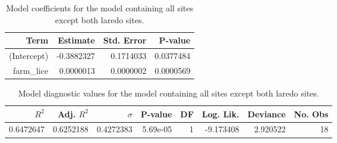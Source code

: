 \begin{table}
\centering
\caption{Model coefficients for the model containing all sites except
    both laredo sites.}
\centering
\begin{tabular}[t]{rrrr}
\toprule
Term & Estimate & Std. Error & P-value\\
\midrule
(Intercept) & -0.3882327 & 0.1714033 & 0.0377484\\
farm\_lice & 0.0000013 & 0.0000002 & 0.0000569\\
\bottomrule
\end{tabular}
\end{table}

\begin{table}
\centering
\caption{Model diagnostic values for the model containing all sites
    except both laredo sites.}
\centering
\begin{tabular}[t]{rrrrrrrr}
\toprule
$R^2$ & Adj. $R^2$ & $\sigma$ & P-value & DF & Log. Lik. & Deviance & No. Obs\\
\midrule
0.6472647 & 0.6252188 & 0.4272383 & 5.69e-05 & 1 & -9.173408 & 2.920522 & 18\\
\bottomrule
\end{tabular}
\end{table}

